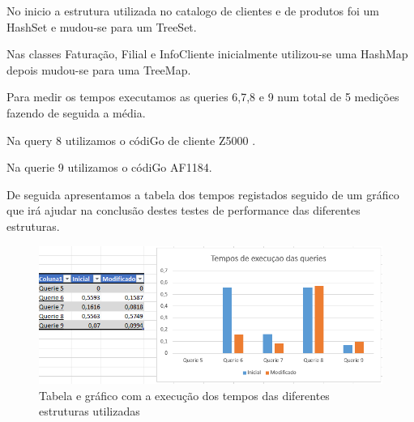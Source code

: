 No inicio a estrutura utilizada no catalogo de clientes e de produtos foi um HashSet e mudou-se para um TreeSet. 


Nas classes Faturação, Filial e InfoCliente inicialmente utilizou-se uma HashMap depois mudou-se para uma TreeMap. 

Para medir os tempos executamos as queries 6,7,8 e 9 num total de 5 medições fazendo de seguida a média.


Na query 8 utilizamos o códiGo de cliente Z5000 . 

Na querie 9 utilizamos o códiGo AF1184. 

\par De seguida apresentamos a tabela dos tempos registados seguido de um gráfico que irá ajudar na conclusão destes testes de performance das diferentes estruturas.

\begin{figure}[h!]
	\includegraphics[scale=0.8]{graficoqueries}  
	\caption{Tabela e gráfico com a execução dos tempos das diferentes estruturas utilizadas }  
\end{figure}
  	